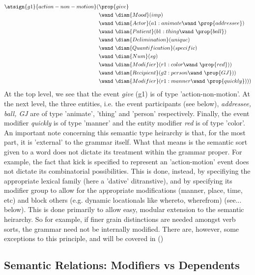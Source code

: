 \begin{align*}
\atsign{g1}{action-non-motion}(& \prop{give}  \\ 
      & \wand\ \diam{Mood}(imp) \\
      & \wand\ \diam{Actor}(a1:animate \wand\ \prop{addressee})  \\ 
      & \wand\ \diam{Patient}(b1:thing  \wand\ \prop{ball})\\
      & \wand\ \diam{Delimination}(unique) \\
      & \wand\ \diam{Quantification}(specific) \\
      & \wand\ \diam{Num}(sg)\\
      & \wand\ \diam{Modifier}(r1:color  \wand\ \prop{red}) )\\
      & \wand\ \diam{Recipient}(g2:person  \wand\ \prop{GJ}) )\\
      & \wand\ \diam{Modifier}(r1:manner \wand\ \prop{quickly}) ))
\end{align*}
At the top level, we see that the event \emph{give} (g1) is of type  'action-non-motion'. At the next level, the three entities, i.e. the event participants (see below), \emph{addressee, ball, GJ} are of type 'animate', 'thing' and 'person' respectively. Finally, the event modifier \emph{quickly} is of type 'manner' and the entity modifier \emph{red} is of type 'color'. An important note concerning this semantic type heirarchy is that, for the most part, it is 'external' to the grammar itself. 
What that means is the semantic sort given to a word does not dictate its treatment within the grammar proper. For example, the fact that kick is specified to represent an 'action-motion' event does not dictate its combinatorial possibilities. This is done, instead, by specifiying the appropriate lexical family (here a 'dative' ditranstive), and by specifying its modifier group to allow for the appropriate modifications (manner, place, time, etc) and block others (e.g. dynamic locationals like whereto, wherefrom) (see... below). This is done primarily to allow easy, modular extension to the semantic heirarchy. So for example, if finer grain distinctions are needed amongst verb sorts, the grammar need not be internally modified. There are, however, some exceptions  to this principle, and will be covered in ()

\subsection{Semantic Relations: Modifiers vs Dependents } \label{sec-Semantic-Relations}

